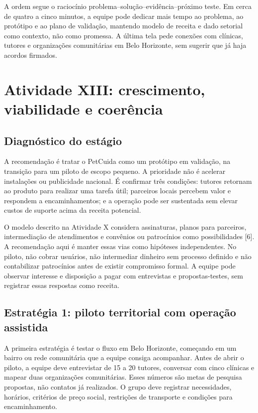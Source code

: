 \documentclass[12pt,a4paper]{article}
\begin{document}
A ordem segue o raciocínio problema--solução--evidência--próximo teste. Em cerca de quatro a cinco minutos, a equipe pode dedicar mais tempo ao problema, ao protótipo e ao plano de validação, mantendo modelo de receita e dado setorial como contexto, não como promessa. A última tela pede conexões com clínicas, tutores e organizações comunitárias em Belo Horizonte, sem sugerir que já haja acordos firmados.

\section{Atividade XIII: crescimento, viabilidade e coerência}

\subsection{Diagnóstico do estágio}

A recomendação é tratar o PetCuida como um protótipo em validação, na transição para um piloto de escopo pequeno. A prioridade não é acelerar instalações ou publicidade nacional. É confirmar três condições: tutores retornam ao produto para realizar uma tarefa útil; parceiros locais percebem valor e respondem a encaminhamentos; e a operação pode ser sustentada sem elevar custos de suporte acima da receita potencial.

O modelo descrito na Atividade X considera assinaturas, planos para parceiros, intermediação de atendimentos e convênios ou patrocínios como possibilidades [6]. A recomendação aqui é manter essas vias como hipóteses independentes. No piloto, não cobrar usuários, não intermediar dinheiro sem processo definido e não contabilizar patrocínios antes de existir compromisso formal. A equipe pode observar interesse e disposição a pagar com entrevistas e propostas-testes, sem registrar essas respostas como receita.

\subsection{Estratégia 1: piloto territorial com operação assistida}

A primeira estratégia é testar o fluxo em Belo Horizonte, começando em um bairro ou rede comunitária que a equipe consiga acompanhar. Antes de abrir o piloto, a equipe deve entrevistar de 15 a 20 tutores, conversar com cinco clínicas e mapear duas organizações comunitárias. Esses números são metas de pesquisa propostas, não contatos já realizados. O grupo deve registrar necessidades, horários, critérios de preço social, restrições de transporte e condições para encaminhamento.
\end{document}
